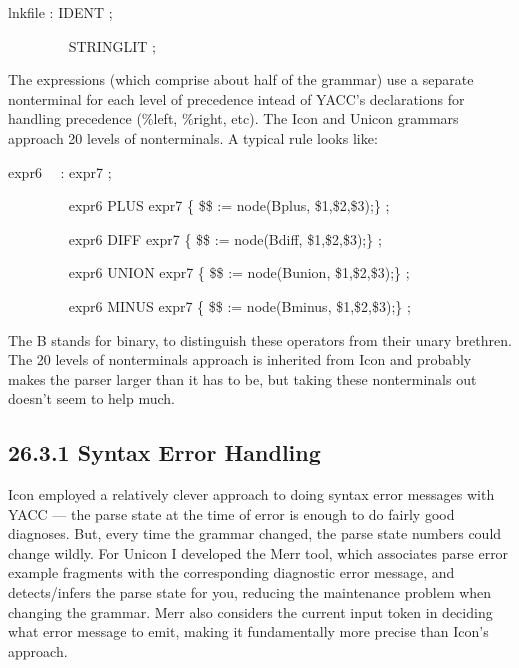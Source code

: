 {\ttfamily\mdseries
lnkfile : IDENT ;}

{\ttfamily\mdseries
\ \ \ \ \ \ \ \ {\textbar} STRINGLIT ;}


The expressions (which comprise about half of the grammar) use a
separate nonterminal for each level of precedence intead of YACC's
declarations for handling precedence (\%left, \%right, etc). The Icon
and Unicon grammars approach 20 levels of nonterminals. A typical rule
looks like:

{\ttfamily\mdseries
expr6 \ \ : expr7 ;}

{\ttfamily\mdseries
\ \ \ \ \ \ \ \ {\textbar} expr6 PLUS expr7 \{ \$\$ := node({\textquotedbl}Bplus{\textquotedbl}, \$1,\$2,\$3);\} ;}

{\ttfamily\mdseries
\ \ \ \ \ \ \ \ {\textbar} expr6 DIFF expr7 \{ \$\$ := node({\textquotedbl}Bdiff{\textquotedbl}, \$1,\$2,\$3);\} ;}

{\ttfamily\mdseries
\ \ \ \ \ \ \ \ {\textbar} expr6 UNION expr7 \{ \$\$ := node({\textquotedbl}Bunion{\textquotedbl}, \$1,\$2,\$3);\} ;}

{\ttfamily\mdseries
\ \ \ \ \ \ \ \ {\textbar} expr6 MINUS expr7 \{ \$\$ := node({\textquotedbl}Bminus{\textquotedbl}, \$1,\$2,\$3);\} ;}


The {\textquotedbl}B{\textquotedbl} stands for
{\textquotedbl}binary{\textquotedbl}, to distinguish these operators
from their unary brethren. The 20 levels of nonterminals approach is
inherited from Icon and probably makes the parser larger than it has
to be, but taking these nonterminals out doesn't seem to help much.

\subsection[26.3.1 Syntax Error Handling]{26.3.1 Syntax Error Handling}

Icon employed a relatively clever approach to doing syntax error
messages with YACC --- the parse state at the time of error is enough
to do fairly good diagnoses. But, every time the grammar changed, the
parse state numbers could change wildly. For Unicon I developed the
Merr tool, which associates parse error example fragments with the
corresponding diagnostic error message, and detects/infers the parse
state for you, reducing the maintenance problem when changing the
grammar. Merr also considers the current input token in deciding what
error message to emit, making it fundamentally more precise than
Icon's approach.

